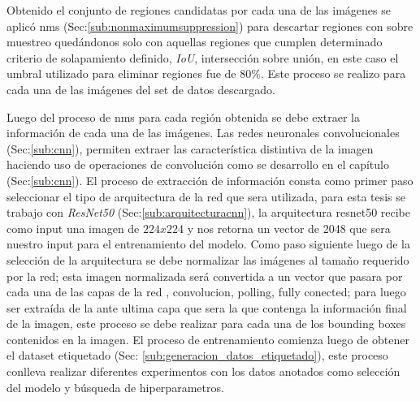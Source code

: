 Obtenido el conjunto de regiones candidatas por cada una de las imágenes se aplicó \ac{nms} (Sec:\ref{sub:nonmaximumsuppression}) para descartar regiones con sobre muestreo quedándonos solo con aquellas regiones que cumplen determinado criterio de solapamiento definido, \textit{IoU}, intersección sobre unión, en este caso el umbral utilizado para eliminar regiones fue de 80\%. Este proceso se realizo para cada una de las imágenes del set de datos descargado.


Luego del proceso de \ac{nms} para cada región obtenida se debe extraer la información de cada una de las imágenes. Las redes neuronales convolucionales (Sec:\ref{sub:cnn}), permiten extraer las característica distintiva de la imagen haciendo uso de operaciones de convolución como se desarrollo en el capítulo (Sec:\ref{sub:cnn}). El proceso de extracción de información consta como primer paso seleccionar el tipo de arquitectura de la red que sera utilizada, para esta tesis se trabajo con \textit{ResNet50} (Sec:\ref{sub:arquitecturacnn}), la arquitectura  resnet50 recibe como input una imagen de $224 x 224$ y nos retorna un vector de 2048 que sera nuestro input para el entrenamiento del modelo.
Como paso siguiente luego de la selección de la arquitectura se debe normalizar las imágenes al tamaño requerido por la red; esta imagen normalizada será convertida a un vector que pasara por cada una de las capas de la red , convolucion, polling, fully conected; para luego ser extraída de la ante ultima capa que sera la que contenga la información final de la imagen, este proceso se debe realizar para cada una de los bounding boxes contenidos en la imagen. El proceso de entrenamiento comienza luego de obtener el dataset etiquetado (Sec: \ref{sub:generacion_datos_etiquetado}), este proceso conlleva realizar diferentes experimentos con los datos anotados como selección del modelo y búsqueda de hiperparametros.




